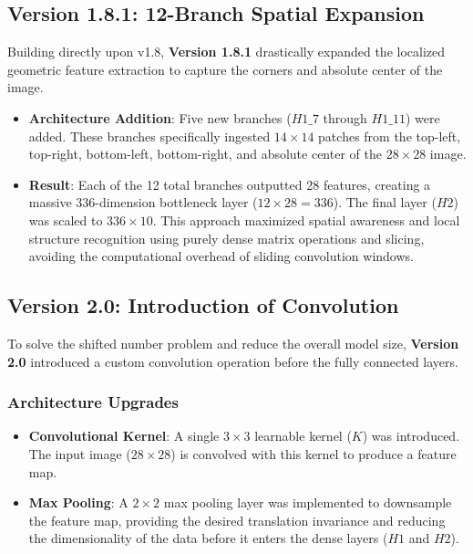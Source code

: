 \documentclass[12pt,a4paper]{article}
\begin{document}
\subsection{Version 1.8.1: 12-Branch Spatial Expansion}
Building directly upon v1.8, \textbf{Version 1.8.1} drastically expanded the localized geometric feature extraction to capture the corners and absolute center of the image.
\begin{itemize}
    \item \textbf{Architecture Addition}: Five new branches ($H1\_7$ through $H1\_11$) were added. These branches specifically ingested $14 \times 14$ patches from the top-left, top-right, bottom-left, bottom-right, and absolute center of the $28 \times 28$ image. 
    \item \textbf{Result}: Each of the 12 total branches outputted 28 features, creating a massive 336-dimension bottleneck layer ($12 \times 28 = 336$). The final layer ($H2$) was scaled to $336 \times 10$. This approach maximized spatial awareness and local structure recognition using purely dense matrix operations and slicing, avoiding the computational overhead of sliding convolution windows.
\end{itemize}

\subsection{Version 2.0: Introduction of Convolution}
To solve the shifted number problem and reduce the overall model size, \textbf{Version 2.0} introduced a custom convolution operation before the fully connected layers.

\subsubsection{Architecture Upgrades}
\begin{itemize}
    \item \textbf{Convolutional Kernel}: A single $3 \times 3$ learnable kernel ($K$) was introduced. The input image ($28 \times 28$) is convolved with this kernel to produce a feature map.
    \item \textbf{Max Pooling}: A $2 \times 2$ max pooling layer was implemented to downsample the feature map, providing the desired translation invariance and reducing the dimensionality of the data before it enters the dense layers ($H1$ and $H2$).
\end{itemize}
\end{document}

